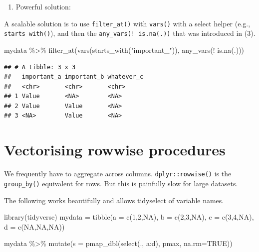 \documentclass[
]{book}
\newenvironment{Shaded}{\begin{snugshade}}{\end{snugshade}}
\newcommand{\AttributeTok}[1]{\textcolor[rgb]{0.77,0.63,0.00}{#1}}
\newcommand{\ConstantTok}[1]{\textcolor[rgb]{0.00,0.00,0.00}{#1}}
\newcommand{\DecValTok}[1]{\textcolor[rgb]{0.00,0.00,0.81}{#1}}
\newcommand{\FunctionTok}[1]{\textcolor[rgb]{0.00,0.00,0.00}{#1}}
\newcommand{\NormalTok}[1]{#1}
\newcommand{\OtherTok}[1]{\textcolor[rgb]{0.56,0.35,0.01}{#1}}
\newcommand{\SpecialCharTok}[1]{\textcolor[rgb]{0.00,0.00,0.00}{#1}}
\newcommand{\StringTok}[1]{\textcolor[rgb]{0.31,0.60,0.02}{#1}}
\providecommand{\tightlist}{%
  \setlength{\itemsep}{0pt}\setlength{\parskip}{0pt}}
\begin{document}
\begin{enumerate}
\def\labelenumi{(\arabic{enumi})}
\setcounter{enumi}{4}
\tightlist
\item
  Powerful solution:
\end{enumerate}

A scalable solution is to use \texttt{filter\_at()} with \texttt{vars()} with a select helper (e.g., \texttt{starts\ with()}), and then the \texttt{any\_vars(!\ is.na(.))} that was introduced in (3).

\begin{Shaded}
\begin{Highlighting}[]
\NormalTok{mydata }\SpecialCharTok{\%\textgreater{}\%} 
  \FunctionTok{filter\_at}\NormalTok{(}\FunctionTok{vars}\NormalTok{(}\FunctionTok{starts\_with}\NormalTok{(}\StringTok{"important\_"}\NormalTok{)), }\FunctionTok{any\_vars}\NormalTok{(}\SpecialCharTok{!} \FunctionTok{is.na}\NormalTok{(.)))}
\end{Highlighting}
\end{Shaded}

\begin{verbatim}
## # A tibble: 3 x 3
##   important_a important_b whatever_c
##   <chr>       <chr>       <chr>     
## 1 Value       <NA>        <NA>      
## 2 Value       Value       <NA>      
## 3 <NA>        Value       <NA>
\end{verbatim}

\hypertarget{vectorising-rowwise-procedures}{%
\section{Vectorising rowwise procedures}\label{vectorising-rowwise-procedures}}

We frequently have to aggregate across columns. \texttt{dplyr::rowwise()} is the \texttt{group\_by()} equivalent for rows. But this is painfully slow for large datasets.

The following works beautifully and allows tidyselect of variable names.

\begin{Shaded}
\begin{Highlighting}[]
\FunctionTok{library}\NormalTok{(tidyverse)}
\NormalTok{mydata }\OtherTok{=} \FunctionTok{tibble}\NormalTok{(}\AttributeTok{a =} \FunctionTok{c}\NormalTok{(}\DecValTok{1}\NormalTok{,}\DecValTok{2}\NormalTok{,}\ConstantTok{NA}\NormalTok{),}
       \AttributeTok{b =} \FunctionTok{c}\NormalTok{(}\DecValTok{2}\NormalTok{,}\DecValTok{3}\NormalTok{,}\ConstantTok{NA}\NormalTok{),}
       \AttributeTok{c =} \FunctionTok{c}\NormalTok{(}\DecValTok{3}\NormalTok{,}\DecValTok{4}\NormalTok{,}\ConstantTok{NA}\NormalTok{),}
       \AttributeTok{d =} \FunctionTok{c}\NormalTok{(}\ConstantTok{NA}\NormalTok{,}\ConstantTok{NA}\NormalTok{,}\ConstantTok{NA}\NormalTok{))}

\NormalTok{mydata }\SpecialCharTok{\%\textgreater{}\%} 
  \FunctionTok{mutate}\NormalTok{(}\AttributeTok{s =} \FunctionTok{pmap\_dbl}\NormalTok{(}\FunctionTok{select}\NormalTok{(., a}\SpecialCharTok{:}\NormalTok{d), pmax, }\AttributeTok{na.rm=}\ConstantTok{TRUE}\NormalTok{))}
\end{Highlighting}
\end{Shaded}
\end{document}
